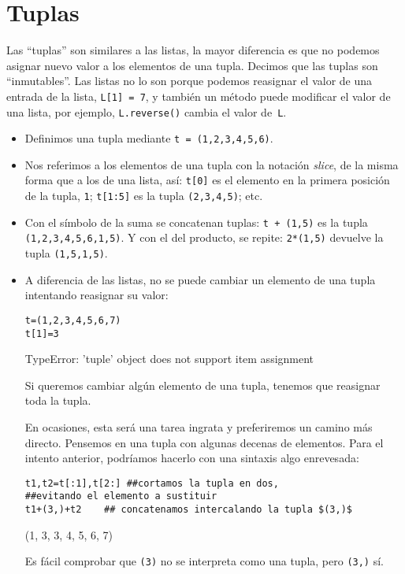    
\section{Tuplas}
Las ``tuplas'' son similares a las listas, la mayor diferencia es que no podemos
asignar nuevo valor a los elementos de
una tupla. Decimos que las tuplas son ``inmutables''. Las listas no lo son
porque
podemos reasignar el valor de una
entrada de la lista, \lstinline|L[1] = 7|, y también un método puede modificar
el valor de una lista, por ejemplo, \lstinline|L.reverse()|
cambia el valor de~\lstinline|L|.


\begin{itemize}
\item Definimos una tupla mediante \lstinline|t = (1,2,3,4,5,6)|.
\item  Nos referimos a los elementos de una tupla con la notación \emph{slice},
de la
misma forma que a los de una lista, así: \lstinline|t[0]| es el elemento en la
primera
posición de la tupla, \lstinline|1|; \lstinline|t[1:5]| es la tupla
\lstinline|(2,3,4,5)|; etc.
\item Con el símbolo de la suma se concatenan tuplas: \lstinline|t + (1,5)| es
la tupla
\lstinline|(1,2,3,4,5,6,1,5)|. Y con el del producto, se repite:
\lstinline|2*(1,5)|
devuelve la tupla \lstinline|(1,5,1,5)|.

\item A diferencia de las listas, no se puede cambiar un elemento
de una tupla intentando reasignar su valor:
\begin{lstlisting}
t=(1,2,3,4,5,6,7)
t[1]=3
\end{lstlisting}
\begin{Output}
	TypeError: 'tuple' object does not support item assignment
\end{Output}
Si queremos cambiar algún elemento de una tupla, tenemos que reasignar toda la
tupla. 

En ocasiones, esta será una tarea ingrata y preferiremos un camino más directo.
Pensemos
en una tupla con algunas decenas de elementos.
Para el intento anterior, podríamos hacerlo con una sintaxis algo enrevesada:
\begin{lstlisting}
t1,t2=t[:1],t[2:] ##cortamos la tupla en dos, 
##evitando el elemento a sustituir
t1+(3,)+t2 	  ## concatenamos intercalando la tupla $(3,)$
\end{lstlisting}
\begin{Output}
	(1, 3, 3, 4, 5, 6, 7)
\end{Output}
Es fácil comprobar que \lstinline|(3)| no se interpreta como una tupla, pero
\lstinline|(3,)| sí.


\end{itemize}
